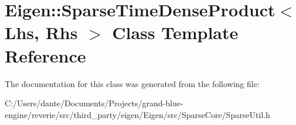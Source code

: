 \hypertarget{class_eigen_1_1_sparse_time_dense_product}{}\section{Eigen\+::Sparse\+Time\+Dense\+Product$<$ Lhs, Rhs $>$ Class Template Reference}
\label{class_eigen_1_1_sparse_time_dense_product}


The documentation for this class was generated from the following file\+:\begin{DoxyCompactItemize}
\item 
C\+:/\+Users/dante/\+Documents/\+Projects/grand-\/blue-\/engine/reverie/src/third\+\_\+party/eigen/\+Eigen/src/\+Sparse\+Core/Sparse\+Util.\+h\end{DoxyCompactItemize}
